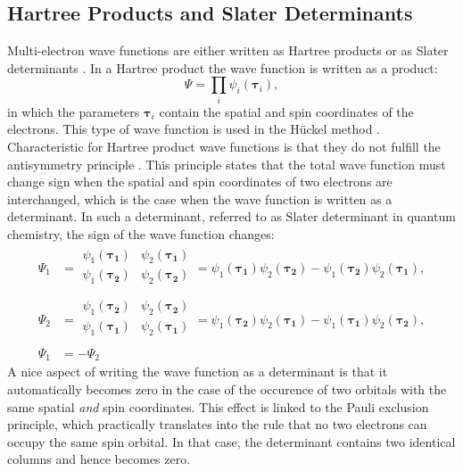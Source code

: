 \subsection{Hartree Products and Slater Determinants}

Multi-electron wave functions are either written as Hartree products \cite{hartree1,hartree2,hartree3} or as Slater determinants \cite{slater}. In a Hartree product the wave function is written as a product:
\begin{equation}
\Psi=\prod_i \psi_i(\mathbf{\tau}_i),
\end{equation}
in which the parameters $\mathbf{\tau}_i$ contain the spatial and spin coordinates of the electrons. This type of wave function is used in the H\"uckel method \cite{huckel1,huckel2,huckel3}. Characteristic for Hartree product wave functions is that they do not fulfill the antisymmetry principle \cite{atkins}. This principle states that the total wave function must change sign when the spatial and spin coordinates of two electrons are interchanged, which is the case when the wave function is written as a determinant. In such a determinant, referred to as Slater determinant in quantum chemistry, the sign of the wave function changes:
\begin{equation}
\begin{split}
\Psi_1 &=
\begin{array}{|cc|}
\psi_1(\mathbf{\tau_1}) & \psi_2(\mathbf{\tau_1}) \\
\psi_1(\mathbf{\tau_2}) & \psi_2(\mathbf{\tau_2}) \\
\end{array}
= \psi_1(\mathbf{\tau_1})\psi_2(\mathbf{\tau_2}) - \psi_1(\mathbf{\tau_2})\psi_2(\mathbf{\tau_1}), \\
\Psi_2 &=
\begin{array}{|cc|}
\psi_1(\mathbf{\tau_2}) & \psi_2(\mathbf{\tau_2}) \\
\psi_1(\mathbf{\tau_1}) & \psi_2(\mathbf{\tau_1}) \\
\end{array}
= \psi_1(\mathbf{\tau_2})\psi_2(\mathbf{\tau_1}) - \psi_1(\mathbf{\tau_1})\psi_2(\mathbf{\tau_2}), \\
\Psi_1 &= - \Psi_2
\end{split}
\label{ch1.eq.slater}
\end{equation}
A nice aspect of writing the wave function as a determinant is that it automatically becomes zero in the case of the occurence of two orbitals with the same spatial \textit{and} spin coordinates. This effect is linked to the Pauli exclusion principle, which practically translates into the rule that no two electrons can occupy the same spin orbital. In that case, the determinant contains two identical columns and hence becomes zero.

